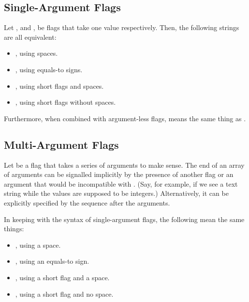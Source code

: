 \subsection{Single-Argument Flags}

Let ,  and ,  be flags that take one value respectively. Then, the following strings are all equivalent:

\begin{itemize}
	\item {}, using spaces.
	\item {}, using equals-to signs.
	\item {}, using short flags and spaces.
	\item {}, using short flags without spaces.
\end{itemize}

Furthermore, when combined with argument-less flags,  means the same thing as .

\subsection{Multi-Argument Flags}

Let  be a flag that takes a series of arguments to make sense. The end of an array of arguments can be signalled implicitly by the presence of another flag or an argument that would be incompatible with . (Say, for example, if we see a text string while the values are supposed to be integers.) Alternatively, it can be explicitly specified by the sequence \monotext{--} after the arguments.

In keeping with the syntax of single-argument flags, the following mean the same things:

\begin{itemize}
	\item {}, using a space.
	\item {}, using an equals-to sign.
	\item {}, using a short flag and a space.
	\item {}, using a short flag and no space.
\end{itemize}

